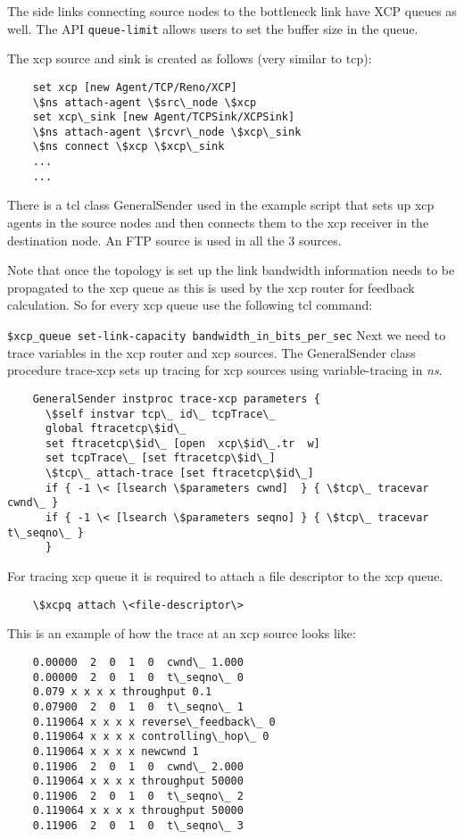   The side links connecting source nodes to the bottleneck link have
  XCP queues as well. 
  The API {\tt queue-limit} allows users to set the buffer size in the queue.
  
  The xcp source and sink is created as follows (very similar to tcp):
  \begin{verbatim}
    set xcp [new Agent/TCP/Reno/XCP]
    \$ns attach-agent \$src\_node \$xcp
    set xcp\_sink [new Agent/TCPSink/XCPSink]
    \$ns attach-agent \$rcvr\_node \$xcp\_sink
    \$ns connect \$xcp \$xcp\_sink
    ...
    ...
  \end{verbatim} %
  
  There is a tcl class GeneralSender used in the example script that
  sets up xcp agents in the source nodes and then connects them to the
  xcp receiver in the destination node. An FTP source is used in all the
  3 sources. 

  Note that once the topology is set up the link bandwidth information
  needs to be propagated to the xcp queue as this is used by the xcp
  router for feedback calculation. So for every xcp queue use the
  following tcl command:
  
  {\tt  \$xcp\_queue set-link-capacity \<bandwidth\_in\_bits\_per\_sec\>}
  Next we need to trace variables in the xcp router and xcp
  sources. The GeneralSender class procedure trace-xcp sets up tracing
  for xcp sources using variable-tracing in \emph{ns}{}. 
  
  \begin{verbatim}
    GeneralSender instproc trace-xcp parameters {
      \$self instvar tcp\_ id\_ tcpTrace\_
      global ftracetcp\$id\_ 
      set ftracetcp\$id\_ [open  xcp\$id\_.tr  w]
      set tcpTrace\_ [set ftracetcp\$id\_]
      \$tcp\_ attach-trace [set ftracetcp\$id\_]
      if { -1 \< [lsearch \$parameters cwnd]  } { \$tcp\_ tracevar cwnd\_ }
      if { -1 \< [lsearch \$parameters seqno] } { \$tcp\_ tracevar t\_seqno\_ }
      }
  \end{verbatim} %
    
  For tracing xcp queue it is required to attach a file descriptor to
  the xcp queue.  
  \begin{verbatim} 
    \$xcpq attach \<file-descriptor\> 
  \end{verbatim} %
    
  This is an example of how the trace at an xcp source looks like:
  \begin{verbatim}
    0.00000  2  0  1  0  cwnd\_ 1.000 
    0.00000  2  0  1  0  t\_seqno\_ 0
    0.079 x x x x throughput 0.1
    0.07900  2  0  1  0  t\_seqno\_ 1
    0.119064 x x x x reverse\_feedback\_ 0
    0.119064 x x x x controlling\_hop\_ 0
    0.119064 x x x x newcwnd 1
    0.11906  2  0  1  0  cwnd\_ 2.000 
    0.119064 x x x x throughput 50000
    0.11906  2  0  1  0  t\_seqno\_ 2
    0.119064 x x x x throughput 50000
    0.11906  2  0  1  0  t\_seqno\_ 3
  \end{verbatim} %
  
